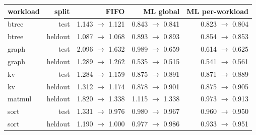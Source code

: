 \begin{tabular}{lrrrr}
\toprule
workload & split & FIFO & ML global & ML per-workload \\
\midrule
btree & test & 1.143 $\to$ 1.121 & 0.843 $\to$ 0.841 & 0.823 $\to$ 0.804 \\
btree & heldout & 1.087 $\to$ 1.068 & 0.893 $\to$ 0.893 & 0.854 $\to$ 0.853 \\
graph & test & 2.096 $\to$ 1.632 & 0.989 $\to$ 0.659 & 0.614 $\to$ 0.625 \\
graph & heldout & 1.289 $\to$ 1.262 & 0.535 $\to$ 0.515 & 0.541 $\to$ 0.561 \\
kv & test & 1.284 $\to$ 1.159 & 0.875 $\to$ 0.891 & 0.871 $\to$ 0.889 \\
kv & heldout & 1.312 $\to$ 1.174 & 0.878 $\to$ 0.901 & 0.875 $\to$ 0.905 \\
matmul & heldout & 1.820 $\to$ 1.338 & 1.115 $\to$ 1.338 & 0.973 $\to$ 0.913 \\
sort & test & 1.331 $\to$ 0.976 & 0.980 $\to$ 0.967 & 0.960 $\to$ 0.950 \\
sort & heldout & 1.190 $\to$ 1.000 & 0.977 $\to$ 0.986 & 0.933 $\to$ 0.951 \\
\bottomrule
\end{tabular}
